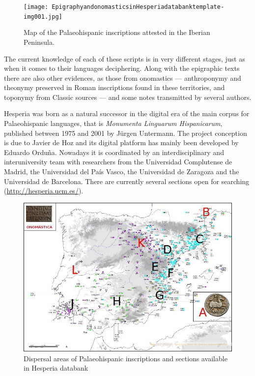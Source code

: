 \documentclass[amsthm,ebook]{saparticle}
\begin{document}
\begin{figure}[!hbp]
\centering
 \texttt{[image: EpigraphyandonomasticsinHesperiadatabanktemplate-img001.jpg]}
\caption{ Map of the Palaeohispanic inscriptions attested in the Iberian Peninsula.}
\label{fig:1}
\end{figure}

\newpage
The current knowledge of each of these scripts is in very different stages, just as when it comes to their languages
deciphering. Along with the epigraphic texts there are also other evidences, as those from onomastics --- anthroponymy
and theonymy preserved in Roman inscriptions found in these territories, and toponymy from Classic sources --- and some
notes transmitted by several authors. 

Hesperia was born as a natural successor in the digital era of the main corpus for Palaeohispanic languages, that is
\emph{Monumenta Linguarum Hispanicarum}, published between 1975 and 2001 by Jürgen Untermann. The project conception is due to
Javier de Hoz and its digital platform has mainly been developed by Eduardo Orduña. Nowadays it is coordinated by an
interdisciplinary and interuniversity team with researchers from the Universidad Complutense de Madrid, the Universidad
del País Vasco, the Universidad de Zaragoza and the Universidad de Barcelona. There are currently several sections open
for searching (\url{http://hesperia.ucm.es/}).

\begin{figure}[!hbp]
\centering
 \includegraphics[width=\columnwidth]{EpigraphyandonomasticsinHesperiadatabanktemplate-img002.png}
\caption{Dispersal areas of Palaeohispanic inscriptions and sections available in Hesperia databank}
\label{fig:2}
\end{figure}
\end{document}
